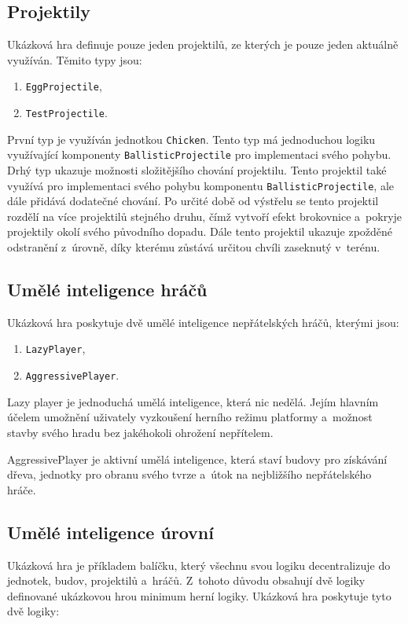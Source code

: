 \bigskip

\subsection{Projektily}
Ukázková hra definuje pouze jeden projektilů, ze kterých je pouze jeden aktuálně využíván. Těmito typy jsou:

\begin{enumerate}
	\item \texttt{EggProjectile},
	\item \texttt{TestProjectile}.
\end{enumerate}

První typ je využíván jednotkou \texttt{Chicken}. Tento typ má jednoduchou logiku využívající komponenty \texttt{BallisticProjectile} pro implementaci svého pohybu. Drhý typ ukazuje možnosti složitějšího chování projektilu. Tento projektil také využívá pro implementaci svého pohybu komponentu \texttt{BallisticProjectile}, ale dále přidává dodatečné chování. Po určité době od výstřelu se tento projektil rozdělí na více projektilů stejného druhu, čímž vytvoří efekt brokovnice a~pokryje projektily okolí svého původního dopadu. Dále tento projektil ukazuje zpožděné odstranění z~úrovně, díky kterému zůstává určitou chvíli zaseknutý v~terénu.

\subsection{Umělé inteligence hráčů}
Ukázková hra poskytuje dvě umělé inteligence nepřátelských hráčů, kterými jsou:

\begin{enumerate}
	\item \texttt{LazyPlayer},
	\item \texttt{AggressivePlayer}.
\end{enumerate}

Lazy player je jednoduchá umělá inteligence, která nic nedělá. Jejím hlavním účelem umožnění uživately vyzkoušení herního režimu platformy a~možnost stavby svého hradu bez jakéhokoli ohrožení nepřítelem.

AggressivePlayer je aktivní umělá inteligence, která staví budovy pro získávání dřeva, jednotky pro obranu svého tvrze a~útok na nejbližšího nepřátelského hráče.

\subsection{Umělé inteligence úrovní}
Ukázková hra je příkladem balíčku, který všechnu svou logiku decentralizuje do jednotek, budov, projektilů a~hráčů. Z~tohoto důvodu obsahují dvě logiky definované ukázkovou hrou minimum herní logiky. Ukázková hra poskytuje tyto dvě logiky:

